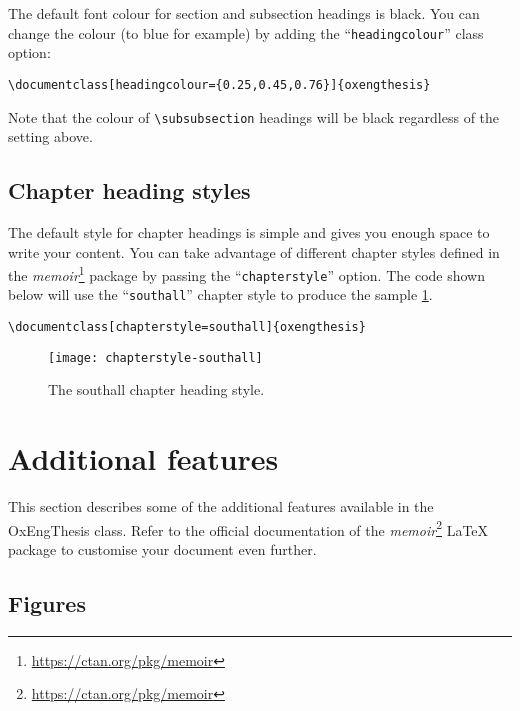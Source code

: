 The default font colour for section and subsection headings is black. You can change the colour (to blue for example) by adding the ``\verb|headingcolour|'' class option:


\begin{lstlisting}[style=custom-latex]
\documentclass[headingcolour={0.25,0.45,0.76}]{oxengthesis}
\end{lstlisting}


Note that the colour of \verb|\subsubsection| headings will be black regardless of the setting above.


\subsection{Chapter heading styles}


The default style for chapter headings is simple and gives you enough space to write your content. You can take advantage of different chapter styles defined in the \textit{memoir}\footnote{\url{https://ctan.org/pkg/memoir}} package by passing the ``\verb|chapterstyle|'' option. The code shown below will use the ``\verb|southall|'' chapter style to produce the sample \cref{fig:ch0:chapterstyle-southall}.


\begin{lstlisting}[style=custom-latex]
\documentclass[chapterstyle=southall]{oxengthesis}
\end{lstlisting}


\begin{figure}[htb]
    \centering
    \texttt{[image: chapterstyle-southall]}
    \caption[The southall chapter heading style]
    {
        The southall chapter heading style.
        \label{fig:ch0:chapterstyle-southall}
    }
\end{figure}


\section{Additional features}

This section describes some of the additional features available in the OxEngThesis class. Refer to the official documentation of the \textit{memoir}\footnote{\url{https://ctan.org/pkg/memoir}} LaTeX package to customise your document even further.

\subsection{Figures}


